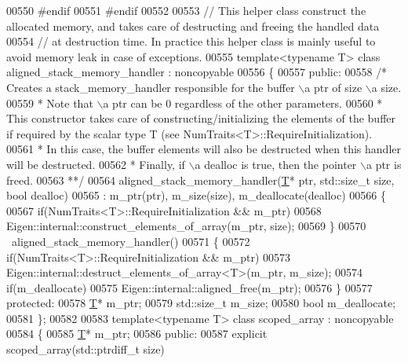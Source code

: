 \begin{DoxyCode}
00550 \textcolor{preprocessor}{  #endif}
00551 \textcolor{preprocessor}{#endif}
00552 
00553 \textcolor{comment}{// This helper class construct the allocated memory, and takes care of destructing and freeing the handled
       data}
00554 \textcolor{comment}{// at destruction time. In practice this helper class is mainly useful to avoid memory leak in case of
       exceptions.}
00555 \textcolor{keyword}{template}<\textcolor{keyword}{typename} T> \textcolor{keyword}{class }aligned\_stack\_memory\_handler : noncopyable
00556 \{
00557   \textcolor{keyword}{public}:
00558     \textcolor{comment}{/* Creates a stack\_memory\_handler responsible for the buffer \(\backslash\)a ptr of size \(\backslash\)a size.}
00559 \textcolor{comment}{     * Note that \(\backslash\)a ptr can be 0 regardless of the other parameters.}
00560 \textcolor{comment}{     * This constructor takes care of constructing/initializing the elements of the buffer if required by
       the scalar type T (see NumTraits<T>::RequireInitialization).}
00561 \textcolor{comment}{     * In this case, the buffer elements will also be destructed when this handler will be destructed.}
00562 \textcolor{comment}{     * Finally, if \(\backslash\)a dealloc is true, then the pointer \(\backslash\)a ptr is freed.}
00563 \textcolor{comment}{     **/}
00564     aligned\_stack\_memory\_handler(\hyperlink{group___sparse_core___module_class_eigen_1_1_triplet}{T}* ptr, std::size\_t size, \textcolor{keywordtype}{bool} dealloc)
00565       : m\_ptr(ptr), m\_size(size), m\_deallocate(dealloc)
00566     \{
00567       \textcolor{keywordflow}{if}(NumTraits<T>::RequireInitialization && m\_ptr)
00568         Eigen::internal::construct\_elements\_of\_array(m\_ptr, size);
00569     \}
00570     ~aligned\_stack\_memory\_handler()
00571     \{
00572       \textcolor{keywordflow}{if}(NumTraits<T>::RequireInitialization && m\_ptr)
00573         Eigen::internal::destruct\_elements\_of\_array<T>(m\_ptr, m\_size);
00574       \textcolor{keywordflow}{if}(m\_deallocate)
00575         Eigen::internal::aligned\_free(m\_ptr);
00576     \}
00577   \textcolor{keyword}{protected}:
00578     \hyperlink{group___sparse_core___module_class_eigen_1_1_triplet}{T}* m\_ptr;
00579     std::size\_t m\_size;
00580     \textcolor{keywordtype}{bool} m\_deallocate;
00581 \};
00582 
00583 \textcolor{keyword}{template}<\textcolor{keyword}{typename} T> \textcolor{keyword}{class }scoped\_array : noncopyable
00584 \{
00585   \hyperlink{group___sparse_core___module_class_eigen_1_1_triplet}{T}* m\_ptr;
00586 \textcolor{keyword}{public}:
00587   \textcolor{keyword}{explicit} scoped\_array(std::ptrdiff\_t size)

\end{DoxyCode}
